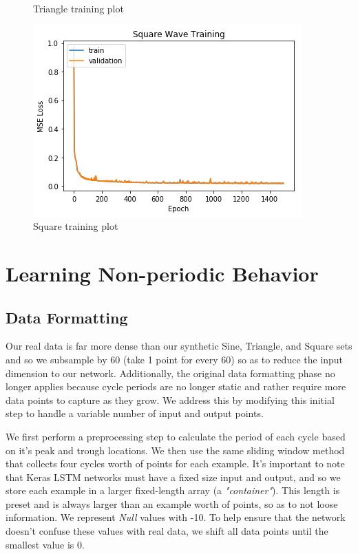 \documentclass[letterpaper, 10 pt, conference]{ieeeconf}  %
\begin{document}
\begin{figure}[!tbp]
\begin{minipage}[b]{0.4\textwidth}
    \caption{Triangle training plot}
  \end{minipage}
    \begin{minipage}[b]{0.4\textwidth}
    \includegraphics[width=\textwidth]{assets/square_training_plot.png}
    \caption{Square training plot}
  \end{minipage}
\end{figure}







\section{Learning Non-periodic Behavior}

\subsection{Data Formatting}

Our real data is far more dense than our synthetic Sine, Triangle, and Square sets and so we subsample by 60 (take 1 point for every 60) so as to reduce the input dimension to our network. Additionally, the original data formatting phase no longer applies because cycle periods are no longer static and rather require more data points to capture as they grow. We address this by modifying this initial step to handle a variable number of input and output points.

We first perform a  preprocessing step to calculate the period of each cycle based on it's peak and trough locations. We then use the same sliding window method that collects four cycles worth of points for each example. It's important to note that Keras LSTM networks must have a fixed size input and output, and so we store each example in a larger fixed-length array (a \textit{"container"}). This length is preset and is always larger than an example worth of points, so as to not loose information. We represent \textit{Null} values with -10. To help ensure that the network doesn't confuse these values with real data, we shift all data points until the smallest value is 0.
\end{document}

